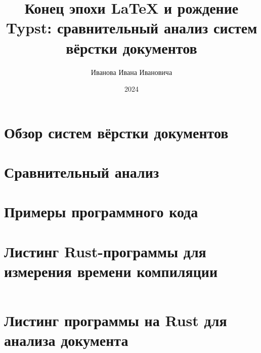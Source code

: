 \documentclass[coursework]{template/SCWorks}
\begin{document}

\title{Конец эпохи {\LaTeX} и рождение Typst: сравнительный анализ систем вёрстки документов}


\author{Иванова Ивана Ивановича}






\date{2024}

\maketitle

\secNumbering

\tableofcontents

\intro


\section{Обзор систем вёрстки документов}


\section{Сравнительный анализ}


\section{Примеры программного кода}


\conclusion





\appendix

\section{Листинг Rust-программы для измерения времени компиляции}
\label{app:rust_benchmark}
\inputminted{rust}{code/compile_benchmark.rs}

\section{Листинг программы на Rust для анализа документа}
\label{app:rust_analyzer}
\inputminted{rust}{code/doc_analyzer.rs}
\end{document}
